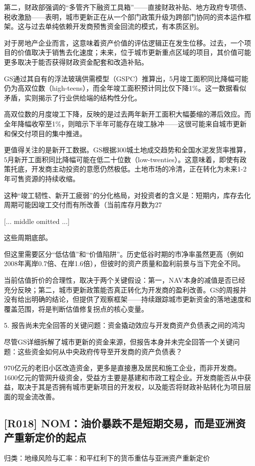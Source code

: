 \documentclass[11pt]{ctexart}
\begin{document}
第二，财政部强调的“多管齐下融资工具箱”——直接财政补贴、地方政府专项债、税收激励——表明，城市更新正在从一个部门政策升级为跨部门协同的资本运作框架。这与过去单纯依赖开发商预售资金回流的模式，有本质区别。

对于房地产企业而言，这意味着资产价值的评估逻辑正在发生位移。过去，一个项目的价值取决于销售去化速度；未来，位于城市更新重点区域的项目，其价值可能更多取决于能否获得财政资金配套和改造补贴。

GS通过其自有的浮法玻璃供需模型（GSPC）推算出，5月竣工面积同比降幅可能仍为高双位数（high-teens），而全年竣工面积预计同比仅下降1\%。这一数据看似矛盾，实则揭示了行业供给端的结构性分化。

高双位数的月度竣工下降，反映的是过去两年新开工面积大幅萎缩的滞后效应。而全年降幅收窄至1\%，则暗示下半年可能存在竣工脉冲——这很可能来自城市更新和保交付项目的集中推进。

更值得关注的是新开工数据。GS根据300城土地成交趋势和全国水泥发货率推算，5月新开工面积同比降幅可能在低二十位数（low-twenties）。这意味着，即使有政策托底，开发商主动投资的意愿仍然极低。土地市场的冷清，正在转化为未来1-2年可售资源的持续收缩。

这种“竣工韧性、新开工疲弱”的分化格局，对投资者的含义是：短期内，库存去化周期可能因竣工交付而有所改善（当前库存月数为27

[... middle omitted ...]

这些周期底部。

但这里需要区分“低估值”和“价值陷阱”。历史低谷时期的市净率虽然更高（例如2008年离岸0.7倍、在岸1.6倍），但彼时的资产质量和盈利前景与当下完全不同。

当前估值折价的合理性，取决于两个关键假设：第一，NAV本身的减值是否已经充分反映；第二，城市更新政策能否真正转化为开发商的盈利改善。GS的周报并没有给出明确的结论，但提供了观察框架——持续跟踪城市更新资金的落地速度和覆盖范围，将是判断估值修复拐点的核心变量。

5. 报告尚未完全回答的关键问题：资金撬动效应与开发商资产负债表之间的鸿沟

尽管GS详细拆解了城市更新的资金来源，但报告本身并未完全回答一个关键问题：这些资金如何从中央政府传导至开发商的资产负债表？

970亿元的老旧小区改造资金，更多是直接惠及居民和施工企业，而非开发商。1600亿元的管网升级资金，受益方主要是基建和市政工程企业。开发商能否从中获益，取决于其是否拥有城市更新项目的开发权，以及能否将财政补贴转化为项目层面的现金流改善。

\subsection{[R018] NOM：油价暴跌不是短期交易，而是亚洲资产重新定价的起点}
{\small\color{refgray}归类：地缘风险与汇率：和平红利下的货币重估与亚洲资产重新定价}
\end{document}
